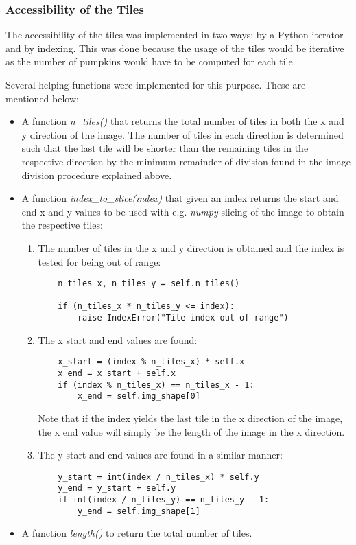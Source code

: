 \documentclass[../Head/Main.tex]{subfiles}
\begin{document}
\subsubsection{Accessibility of the Tiles}
The accessibility of the tiles was implemented in two ways; by a Python iterator and by indexing. This was done because the usage of the tiles would be iterative as the number of pumpkins would have to be computed for each tile.\par
Several helping functions were implemented for this purpose. These are mentioned below:
\begin{itemize}
\item A function \textit{n\_tiles()} that returns the total number of tiles in both the x and y direction of the image. The number of tiles in each direction is determined such that the last tile will be shorter than the remaining tiles in the respective direction by the minimum remainder of division found in the image division procedure explained above.
\item A function \textit{index\_to\_slice(index)} that given an index returns the start and end x and y values to be used with e.g. \textit{numpy} slicing of the image to obtain the respective tiles:
\begin{enumerate}
\item The number of tiles in the x and y direction is obtained and the index is tested for being out of range:
\begin{verbatim}
    n_tiles_x, n_tiles_y = self.n_tiles()

    if (n_tiles_x * n_tiles_y <= index):
        raise IndexError("Tile index out of range")
\end{verbatim}
\item The x start and end values are found:
\begin{verbatim}
    x_start = (index % n_tiles_x) * self.x
    x_end = x_start + self.x
    if (index % n_tiles_x) == n_tiles_x - 1:
        x_end = self.img_shape[0]
\end{verbatim}
Note that if the index yields the last tile in the x direction of the image, the x end value will simply be the length of the image in the x direction.
\item The y start and end values are found in a similar manner:
\begin{verbatim}
    y_start = int(index / n_tiles_x) * self.y
    y_end = y_start + self.y
    if int(index / n_tiles_y) == n_tiles_y - 1:
        y_end = self.img_shape[1]

\end{verbatim}
\end{enumerate}
\item A function \textit{length()} to return the total number of tiles.
\end{itemize}
\end{document}
